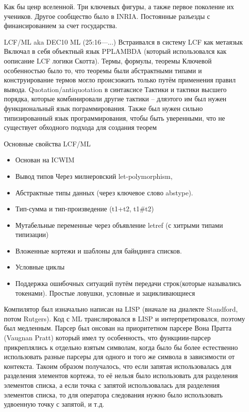 \documentclass[14pt]{matmex-diploma-custom}
\begin{document}
Как бы ценр вселенной. Три ключевых фигуры, а также первое поколение их учеников. Другое сообщество было в INRIA. Постоянные разъезды с финансированием за счет государства.

LCF/ML aka DEC10 ML (25:16---...)
Встраивался в систему LCF как метаязык
Включал в себя объектный язык PPLAMBDA (который использовался как оописание LCF логики Скотта). 
Термы, формулы, теоремы 
Ключевой особенностью было то, что теоремы были абстрактными типами и конструирование термов могло происзожить только путём применения правил вывода.
Quotation/antiquotation в синтаксисе
Тактики и тактики высшего порядка, которые комбинировали другие тактики -- дляэтого им был нужен функциональный язык пограммирования. Также был нужен сильно типизированный язык программирования, чтобы быть уверенными, что не существует обходного подхода для создания теорем

Основные свойства LCF/ML
\begin{itemize}
  \item Основан на ICWIM
  \item Вывод типов Через милнеровский let-polymorphism,
  \item Абстрактные типы данных (через ключевое слово abstype).
  \item Тип-сумма и тип-произведение (t1+t2, t1\#t2)
  \item Мутабельные переменные через объявление letref (с хитрыми типами типизации)
  \item Вложенные кортежи и шаблоны для байндинга списков.
  \item Условные циклы
  \item Поддержка ошибочных ситуаций путём передачи строк(которые назывались токенами). Простые ловушки, условные и зацикливающиеся 
\end{itemize}


 Компилятор был изначально написан на LISP (вначале на диалекте Standford, потом Rutgers). Код с ML транслировался в LISP и интерпретировался, поэтому был медленным. Парсер был онсован на приоритетном парсере Вона Пратта (Vaugnan Pratt) который имел ту особенность, что функциии-парсер прикреплялись к отдельно взятым символам, когда было бы более естественно использовать разные парсеры для одного и того же символа в зависимости от контекста. Такоим образом получалось, что если запятая использовалась для разделения элементов кортежа, то её нельзя было использовать для разделения элементов списка, а если точка с запятой использовалась для разделения элементов списка, то для оператора следования нужно было использовать удвоенную точку с запятой, и т.д.
\end{document}

